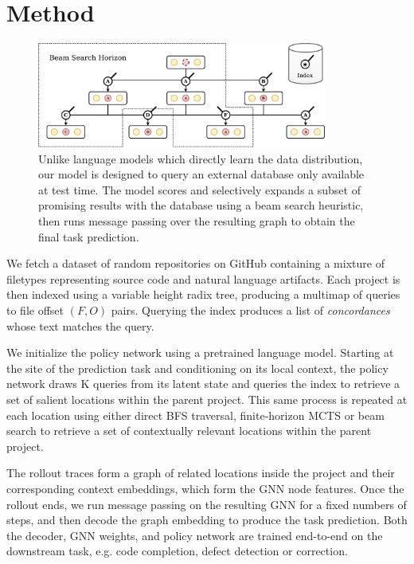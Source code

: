 \documentclass[11pt]{article}
\begin{document}
\section{Method}


\begin{figure}
  \centering
  \includegraphics[width=0.85\textwidth]{architecture}
  \caption{Unlike language models which directly learn the data distribution, our model is designed to query an external database only available at test time. The model scores and selectively expands a subset of promising results with the database using a beam search heuristic, then runs message passing over the resulting graph to obtain the final task prediction.}
\end{figure}

We fetch a dataset of random repositories on GitHub containing a mixture of filetypes representing source code and natural language artifacts. Each project is then indexed using a variable height radix tree, producing a multimap of queries to file offset $(F, O)$ pairs. Querying the index produces a list of \textit{concordances} whose text matches the query.

 We initialize the policy network using a pretrained language model. Starting at the site of the prediction task and conditioning on its local context, the policy network draws K queries from its latent state and queries the index to retrieve a set of salient locations within the parent project. This same process is repeated at each location using either direct BFS traversal, finite-horizon MCTS or beam search to retrieve a set of contextually relevant locations within the parent project.

The rollout traces form a graph of related locations inside the project and their corresponding context embeddings, which form the GNN node features. Once the rollout ends, we run message passing on the resulting GNN for a fixed numbers of steps, and then decode the graph embedding to produce the task prediction. Both the decoder, GNN weights, and policy network are trained end-to-end on the downstream task, e.g. code completion, defect detection or correction.
\end{document}
